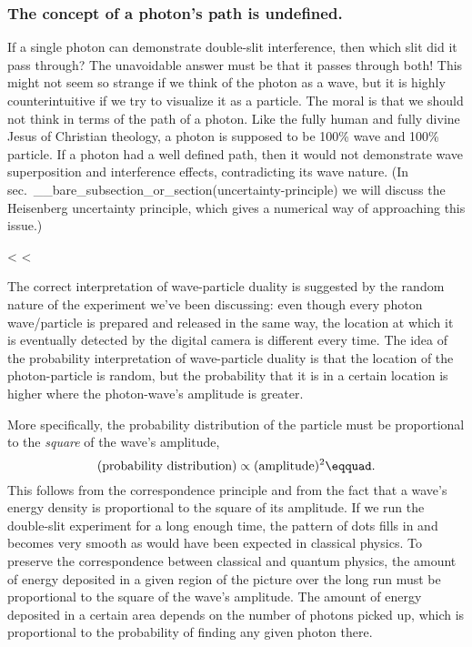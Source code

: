 \subsubsection{The concept of a photon's
 path is undefined.}
If a single photon can demonstrate double-slit interference,
then which slit did it pass through? The unavoidable answer
must be that it passes through both! This might not seem so
strange if we think of the photon as a wave, but it is
highly counterintuitive if we try to visualize it as a
particle. The moral is that we should not think in terms of
the path of a photon. Like the fully human and fully divine
Jesus of Christian theology, a photon is supposed to be
100\% wave and 100\% particle. If a photon had a well
defined path, then it would not demonstrate wave superposition
and interference effects, contradicting its wave nature. (In
sec.~__bare_subsection_or_section(uncertainty-principle)
we will discuss the Heisenberg uncertainty
principle, which gives a numerical way of approaching this issue.)

<%
<%

The correct interpretation of wave-particle duality is
suggested by the random nature of the experiment we've been
discussing: even though every photon wave/particle is
prepared and released in the same way, the location at which
it is eventually detected by the digital camera is different
every time. The idea of the probability interpretation of
wave-particle duality is that the location of the photon-particle
is random, but the probability that it is in a certain
location is higher where the photon-wave's amplitude is greater.

More specifically, the probability distribution of the
particle must be proportional to the \emph{square} of
the wave's amplitude,
\begin{equation*}
    (\text{probability distribution}) \propto (\text{amplitude})^2\eqquad.
\end{equation*}
This follows from the correspondence principle and from the
fact that a wave's energy density is proportional to the
square of its amplitude. If we run the double-slit
experiment for a long enough time, the pattern of dots fills
in and becomes very smooth as would have been expected in
classical physics. To preserve the correspondence between
classical and quantum physics, the amount of energy
deposited in a given region of the picture over the long run
must be proportional to the square of the wave's amplitude.
The amount of energy deposited in a certain area depends on
the number of photons picked up, which is proportional to
the probability of finding any given photon there.



